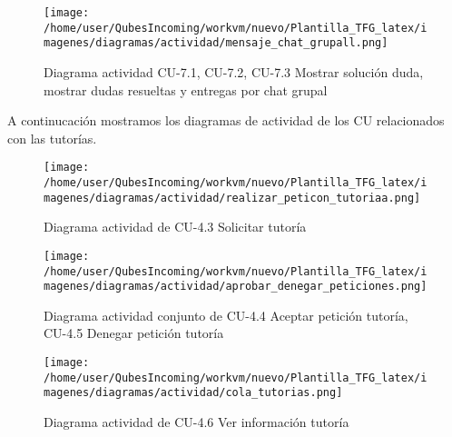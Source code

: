         \begin{figure}[H] %
\centering
\texttt{[image: /home/user/QubesIncoming/workvm/nuevo/Plantilla\_TFG\_latex/imagenes/diagramas/actividad/mensaje\_chat\_grupall.png]}  %

\caption{Diagrama actividad CU-7.1, CU-7.2, CU-7.3  Mostrar solución duda, mostrar dudas resueltas y entregas por chat grupal}\label{figura141}
\end{figure}

A continucación mostramos los diagramas de actividad de los CU relacionados con las tutorías.

        \begin{figure}[H] %
\centering
\texttt{[image: /home/user/QubesIncoming/workvm/nuevo/Plantilla\_TFG\_latex/imagenes/diagramas/actividad/realizar\_peticon\_tutoriaa.png]}  %

\caption{Diagrama actividad de CU-4.3 Solicitar tutoría}\label{figura143}
\end{figure}

        \begin{figure}[H] %
\centering
\texttt{[image: /home/user/QubesIncoming/workvm/nuevo/Plantilla\_TFG\_latex/imagenes/diagramas/actividad/aprobar\_denegar\_peticiones.png]}  %

\caption{Diagrama actividad conjunto de CU-4.4 Aceptar petición tutoría, CU-4.5 Denegar petición tutoría}\label{figura144}
\end{figure}

        \begin{figure}[H] %
\centering
\texttt{[image: /home/user/QubesIncoming/workvm/nuevo/Plantilla\_TFG\_latex/imagenes/diagramas/actividad/cola\_tutorias.png]}  %

\caption{Diagrama actividad  de CU-4.6 Ver información tutoría}\label{figura145}
\end{figure}



